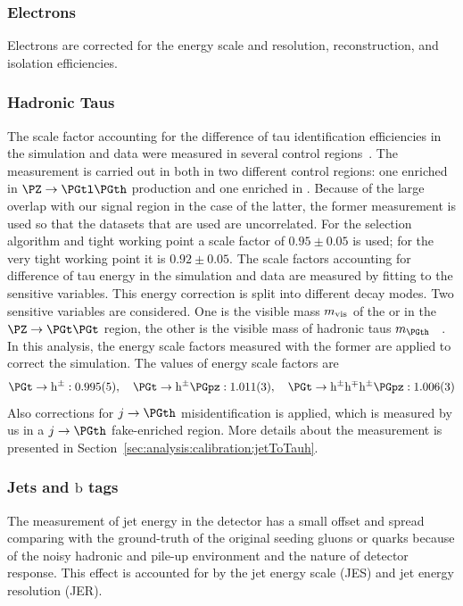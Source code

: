 \subsubsection{Electrons} 
Electrons are corrected for the energy scale and resolution, reconstruction, and isolation efficiencies.

\subsubsection{Hadronic Taus} 
The scale factor accounting for the difference of tau identification efficiencies in the simulation and data were measured in several control regions~\cite{CMS-TAU-16-003-001}.  The measurement is carried out in both in two different control regions: one enriched in $\PZ\to\PGtl\PGth$ production and one enriched in \ttbar.  Because of the large overlap with our signal region in the case of the latter, the former measurement is used so that the datasets that are used are uncorrelated.  For the selection algorithm and tight working point a scale factor of $0.95 \pm 0.05$ is used; for the very tight working point it is $0.92 \pm 0.05$. The scale factors accounting for difference of tau energy in the  simulation and data are measured by fitting to the sensitive variables. This energy correction is split into different \PGth decay modes.  Two sensitive variables are considered. One is the visible mass $m_{\rm vis}$ of the \cet or \cmt in the $\PZ\to\PGt\PGt$ region, the other is the visible mass of hadronic taus $m_\PGth$ ~\cite{CMS-TAU-16-003-001}. In this analysis, the energy scale factors measured with the former are applied to correct the simulation. The values of energy scale factors are
\begin{equation*}
    \PGt \to \mathrm{h}^{\pm}:0.995(5), \quad \PGt \to \mathrm{h}^{\pm}\PGpz:1.011(3), \quad \PGt \to \mathrm{h}^{\pm}\mathrm{h}^{\mp}\mathrm{h}^{\pm}\PGpz:1.006(3)
\end{equation*}
\noindent Also corrections for $j\to \PGth$ misidentification is applied, which is measured by us in a $j\to \PGth$ fake-enriched region. More details about the measurement is presented in Section~\ref{sec:analysis:calibration:jetToTauh}.


\subsubsection{Jets and $\mathrm{b}$ tags}
The measurement of jet energy in the detector has a small offset and spread comparing with the ground-truth of the original seeding gluons or quarks because of the noisy hadronic and pile-up environment and the nature of detector response. This effect is accounted for by the jet energy scale (JES) and jet energy resolution (JER).

